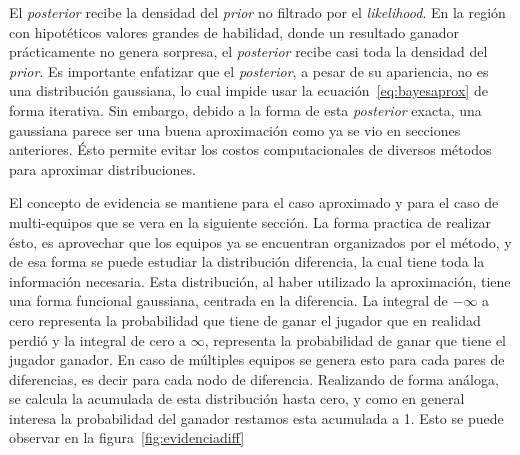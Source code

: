 \documentclass[11pt,twoside,spanish]{report} %
\begin{document}

El \textit{posterior} recibe la densidad del \textit{prior} no filtrado por el \textit{likelihood}.
En la regi\'on con hipot\'eticos valores grandes de habilidad, donde un resultado ganador pr\'acticamente no genera sorpresa, el \textit{posterior} recibe casi toda la densidad del \textit{prior}.
Es importante enfatizar que el \textit{posterior}, a pesar de su apariencia, no es una distribuci\'on gaussiana, lo cual impide usar la ecuaci\'on~\ref{eq:bayesaprox} de forma iterativa.
Sin embargo, debido a la forma de esta \textit{posterior} exacta, una gaussiana parece ser una buena aproximaci\'on como ya se vio en secciones anteriores.
\'Esto permite evitar los costos computacionales de diversos m\'etodos para aproximar distribuciones.

El concepto de evidencia se mantiene para el caso aproximado y para el caso de multi-equipos que se vera en la siguiente secci\'on.
La forma practica de realizar \'esto, es aprovechar que los equipos ya se encuentran organizados por el m\'etodo, y de esa forma se puede estudiar la distribuci\'on diferencia, la cual tiene toda la informaci\'on necesaria.
Esta distribuci\'on, al haber utilizado la aproximaci\'on, tiene una forma funcional gaussiana, centrada en la diferencia.
La integral de $-\infty$ a cero representa la probabilidad que tiene de ganar el jugador que en realidad perdi\'o y la integral de cero a  $\infty$, representa la probabilidad de ganar que tiene el jugador ganador.
En caso de m\'ultiples equipos se genera esto para cada pares de diferencias, es decir para cada nodo de diferencia.
Realizando de forma an\'aloga, se calcula la acumulada de esta distribuci\'on hasta cero, y como en general interesa la probabilidad del ganador restamos esta acumulada a 1.
Esto se puede observar en la figura~\ref{fig:evidenciadiff}
\end{document}
